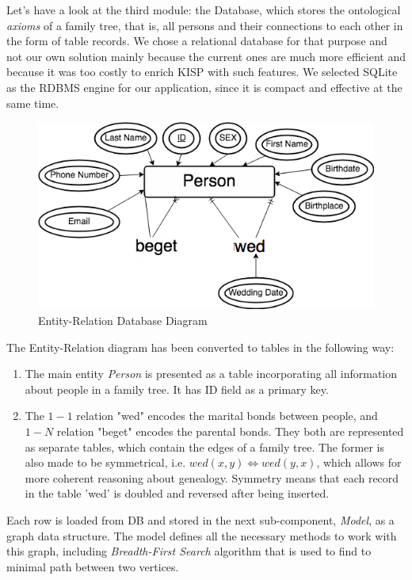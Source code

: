     Let's have a look at the third module: the Database, which stores the ontological \textit{axioms} of a family tree, that is, all
    persons and
    their connections to each other in the form of table records. We chose a relational database for that purpose and not our own
    solution mainly because the current ones are much more efficient and because it was too costly to enrich KISP with such
    features. We selected SQLite as the RDBMS engine for our application, since it is compact and effective at the same time.
    \begin{figure}[h!]
        \centering
        \includegraphics[width=\linewidth]{figs/entity.png}
        \caption{Entity-Relation Database Diagram}
        \label{fig:er}
    \end{figure}
    The Entity-Relation diagram has been converted to tables in the following way:
    \begin{enumerate}
        \item{The main entity \textit{Person} is presented as a table incorporating all information about people in a family tree. It
            has ID field as a primary key. }
        \item{The $1-1$ relation "wed" encodes the marital bonds between people, and $1-N$ relation "beget" encodes the parental
            bonds. They both are represented as separate tables, which contain the edges of a family tree. The former is also made to
            be symmetrical, i.e. $wed(x, y) \iff wed(y, x)$, which allows for more coherent reasoning about genealogy. Symmetry means that
            each record in the table 'wed' is doubled and reversed after being inserted.}
    \end{enumerate}
    Each row is loaded from DB and stored in the next sub-component, \textit{Model}, as a graph data structure. The model defines all
    the necessary methods to work with this graph, including \textit{Breadth-First Search} algorithm that is used to find to minimal
    path between two vertices.

